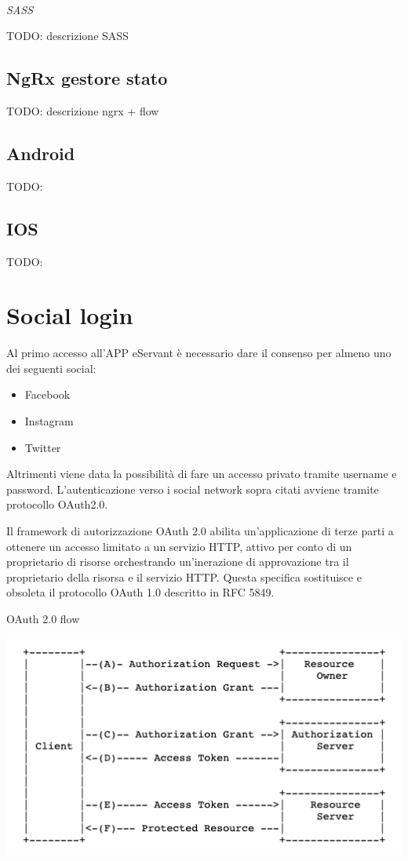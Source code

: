 \paragraph{}
\textit{SASS}

TODO: descrizione SASS

\subsection{NgRx gestore stato}

TODO: descrizione ngrx + flow

\subsection{Android}
TODO:

\subsection{IOS}
TODO:

\section{Social login}
Al primo accesso all'APP eServant è necessario dare il consenso per almeno uno dei seguenti social:
\begin{itemize}
\item Facebook
\item Instagram
\item Twitter
\end{itemize}

Altrimenti viene data la possibilità di fare un accesso privato tramite username e password.
L'autenticazione verso i social network sopra citati avviene tramite protocollo OAuth2.0.

Il framework di autorizzazione OAuth 2.0 abilita un'applicazione di terze parti a ottenere un accesso limitato a un servizio HTTP, attivo
per conto di un proprietario di risorse orchestrando un'inerazione di approvazione tra il proprietario della risorsa e il servizio HTTP.
Questa specifica sostituisce e obsoleta il protocollo OAuth 1.0 descritto in RFC 5849.

OAuth 2.0 flow 

\includegraphics[scale=0.60]{img/cap2/oauth20-1}\\

